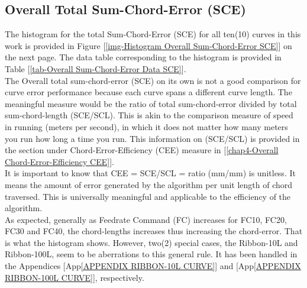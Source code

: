 \clearpage
\pagebreak

\subsection{Overall Total Sum-Chord-Error (SCE)}

The histogram for the total Sum-Chord-Error (SCE) for all ten(10) curves in this work is provided in Figure [\ref{img-Histogram Overall Sum-Chord-Error SCE}] on the next page. The data table corresponding to the histogram is provided in Table [\ref{tab-Overall Sum-Chord-Error Data SCE}]. \\

The Overall total sum-chord-error (SCE) on its own is not a good comparison for curve error performance because each curve spans a different curve length. The meaningful measure would be the ratio of total sum-chord-error divided by total sum-chord-length (SCE/SCL). This is akin to the comparison measure of speed in running (meters per second), in which it does not matter how many meters you run how long a time you run. This information on (SCE/SCL) is provided in the section under Chord-Error-Efficiency (CEE) measure in [\ref{chap4-Overall Chord-Error-Efficiency CEE}].\\ 

\noindent
It is important to know that CEE = SCE/SCL = ratio (mm/mm) is unitless. It means the amount of error generated by the algorithm per unit length of chord traversed. This is universally meaningful and applicable to the efficiency of the algorithm.\\

As expected, generally as Feedrate Command (FC) increases for FC10, FC20, FC30 and FC40, the chord-lengths increases thus increasing the chord-error. That is what the histogram shows. However, two(2) special cases, the Ribbon-10L and Ribbon-100L, seem to be aberrations to this general rule. It has been handled in the Appendices [App\ref{APPENDIX RIBBON-10L CURVE}] and [App\ref{APPENDIX RIBBON-100L CURVE}], respectively.\\
 

